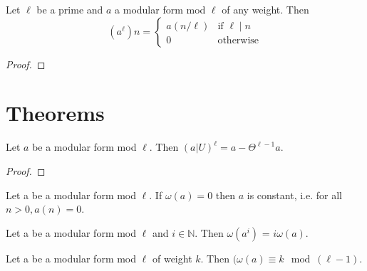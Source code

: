 \begin{theorem} 
  \label{thm:Pow_Prime}
  \leanok
  Let $\ell$ be a prime and $a$ a modular form mod $\ell$ of any weight. Then \\
  \[(a ^ \ell) n = \begin{cases} a (n / \ell) & \text{if $\ell \mid n$} \\
    0 & \text{otherwise} \end{cases} \]
\end{theorem}
\begin{proof}
  \leanok
\end{proof}



\section{Theorems}

\begin{theorem}
  \label{thm:U_pow_l_eq_self_sub_Theta_pow_l_sub_one}
  \leanok
  Let $a$ be a modular form mod $\ell$. Then $(a|U) ^ \ell = a - \Theta^{\ell - 1} a$.
\end{theorem}
\begin{proof}
  \leanok
\end{proof}


\begin{lemma}
  \label{lem:const_of_Filt_zero}
  \leanok
  Let a be a modular form mod $\ell$. If $\omega (a) = 0$ then $a$ is constant, 
  i.e. for all $n > 0, a(n) = 0$.
\end{lemma}

\begin{theorem}
  \label{thm:Filtration_Log}
  \leanok
  Let a be a modular form mod $\ell$ and $i \in \mathbb{N}$. 
  Then $\omega (a ^ i)$ = $i \omega (a)$.
\end{theorem}

\begin{theorem}
  \label{thm:Filtration_congruence}
  \leanok
  Let a be a modular form mod $\ell$ of weight $k$. Then 
  $(\omega (a) \equiv k \mod (\ell - 1)$. 
\end{theorem}


